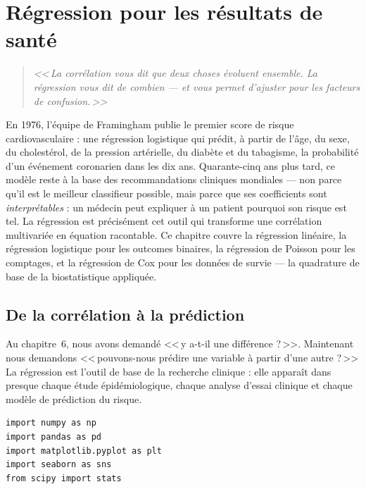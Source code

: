\chapter{R\'egression pour les r\'esultats de sant\'e}
\label{ch:regression}

\begin{quote}
\emph{<<\,La corr\'elation vous dit que deux choses \'evoluent ensemble. La r\'egression vous dit de combien --- et vous permet d'ajuster pour les facteurs de confusion.\,>>}
\end{quote}

En 1976, l'équipe de Framingham publie le premier score de risque cardiovasculaire : une régression logistique qui prédit, à partir de l'âge, du sexe, du cholestérol, de la pression artérielle, du diabète et du tabagisme, la probabilité d'un événement coronarien dans les dix ans. Quarante-cinq ans plus tard, ce modèle reste à la base des recommandations cliniques mondiales --- non parce qu'il est le meilleur classifieur possible, mais parce que ses coefficients sont \emph{interprétables} : un médecin peut expliquer à un patient pourquoi son risque est tel. La régression est précisément cet outil qui transforme une corrélation multivariée en équation racontable. Ce chapitre couvre la régression linéaire, la régression logistique pour les outcomes binaires, la régression de Poisson pour les comptages, et la régression de Cox pour les données de survie --- la quadrature de base de la biostatistique appliquée.

\section{De la corr\'elation \`a la pr\'ediction}

Au chapitre~6, nous avons demand\'e <<\,y a-t-il une diff\'erence ?\,>>. Maintenant nous demandons <<\,pouvons-nous pr\'edire une variable \`a partir d'une autre ?\,>> La r\'egression est l'outil de base de la recherche clinique : elle appara\^it dans presque chaque \'etude \'epid\'emiologique, chaque analyse d'essai clinique et chaque mod\`ele de pr\'ediction du risque.

\begin{verbatim}
import numpy as np
import pandas as pd
import matplotlib.pyplot as plt
import seaborn as sns
from scipy import stats
\end{verbatim}

